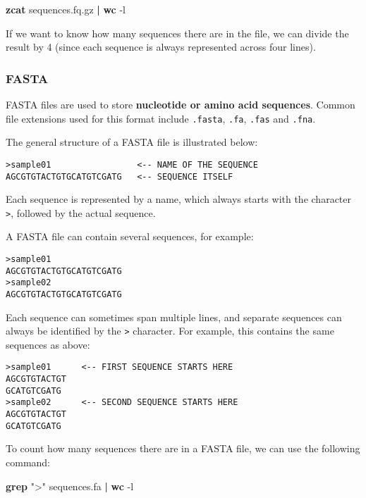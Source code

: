 \documentclass[
]{article}
\newenvironment{Shaded}{\begin{snugshade}}{\end{snugshade}}
\newcommand{\AttributeTok}[1]{\textcolor[rgb]{0.13,0.29,0.53}{#1}}
\newcommand{\FunctionTok}[1]{\textcolor[rgb]{0.13,0.29,0.53}{\textbf{#1}}}
\newcommand{\KeywordTok}[1]{\textcolor[rgb]{0.13,0.29,0.53}{\textbf{#1}}}
\newcommand{\NormalTok}[1]{#1}
\newcommand{\StringTok}[1]{\textcolor[rgb]{0.31,0.60,0.02}{#1}}
\begin{document}
\begin{Shaded}
\begin{Highlighting}[]
\FunctionTok{zcat}\NormalTok{ sequences.fq.gz }\KeywordTok{|} \FunctionTok{wc} \AttributeTok{{-}l}
\end{Highlighting}
\end{Shaded}

If we want to know how many sequences there are in the file, we can
divide the result by 4 (since each sequence is always represented across
four lines).

\subsubsection{FASTA}\label{fasta}

FASTA files are used to store \textbf{nucleotide or amino acid
sequences}. Common file extensions used for this format include
\texttt{.fasta}, \texttt{.fa}, \texttt{.fas} and \texttt{.fna}.

The general structure of a FASTA file is illustrated below:

\begin{verbatim}
>sample01                 <-- NAME OF THE SEQUENCE
AGCGTGTACTGTGCATGTCGATG   <-- SEQUENCE ITSELF
\end{verbatim}

Each sequence is represented by a name, which always starts with the
character \texttt{\textgreater{}}, followed by the actual sequence.

A FASTA file can contain several sequences, for example:

\begin{verbatim}
>sample01
AGCGTGTACTGTGCATGTCGATG
>sample02
AGCGTGTACTGTGCATGTCGATG
\end{verbatim}

Each sequence can sometimes span multiple lines, and separate sequences
can always be identified by the \texttt{\textgreater{}} character. For
example, this contains the same sequences as above:

\begin{verbatim}
>sample01      <-- FIRST SEQUENCE STARTS HERE
AGCGTGTACTGT
GCATGTCGATG
>sample02      <-- SECOND SEQUENCE STARTS HERE
AGCGTGTACTGT
GCATGTCGATG
\end{verbatim}

To count how many sequences there are in a FASTA file, we can use the
following command:

\begin{Shaded}
\begin{Highlighting}[]
\FunctionTok{grep} \StringTok{"\textgreater{}"}\NormalTok{ sequences.fa }\KeywordTok{|} \FunctionTok{wc} \AttributeTok{{-}l}
\end{Highlighting}
\end{Shaded}
\end{document}
